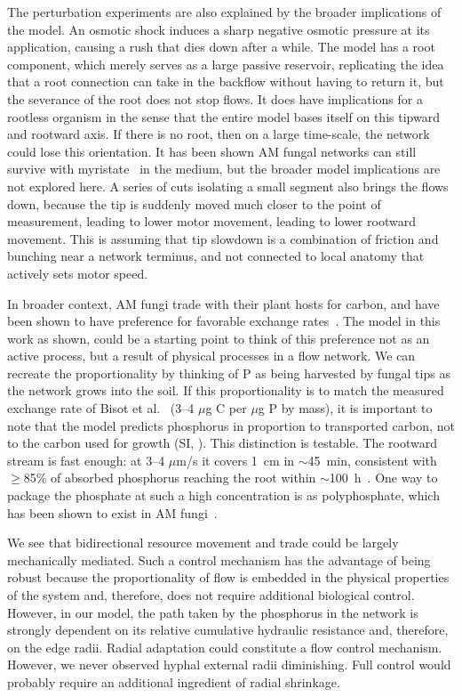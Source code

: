 The perturbation experiments are also explained by the broader implications of the model.
An osmotic shock induces a sharp negative osmotic pressure at its application, causing a rush that dies down after a while.
The model has a root component, which merely serves as a large passive reservoir, replicating the idea that a root connection can take in the backflow without having to return it, but the severance of the root does not stop flows.
It does have implications for a rootless organism in the sense that the entire model bases itself on this tipward and rootward axis.
If there is no root, then on a large time-scale, the network could lose this orientation.
It has been shown AM fungal networks can still survive with myristate~\cite{kleinCytoplasmicFlowDynamics2026} in the medium, but the broader model implications are not explored here.
A series of cuts isolating a small segment also brings the flows down, because the tip is suddenly moved much closer to the point of measurement, leading to lower motor movement, leading to lower rootward movement.
This is assuming that tip slowdown is a combination of friction and bunching near a network terminus, and not connected to local anatomy that actively sets motor speed. 

In broader context, AM fungi trade with their plant hosts for carbon, and have been shown to have preference for favorable exchange rates~\cite{kiers_reciprocal_2011,bisot_carbon-phosphorous_2025}.
The model in this work as shown, could be a starting point to think of this preference not as an active process, but a result of physical processes in a flow network.
We can recreate the proportionality by thinking of P as being harvested by fungal tips as the network grows into the soil.
If this proportionality is to match the measured exchange rate of Bisot et al.~\cite{bisot_carbon-phosphorous_2025} (3--4 $\mu$g C per $\mu$g P by mass), it is important to note that the model predicts phosphorus in proportion to transported carbon, not to the carbon used for growth (SI, ).
This distinction is testable.
The rootward stream is fast enough: at 3--4 $\mu$m/s it covers 1~cm in $\sim$45~min, consistent with $\geq$85\% of absorbed phosphorus reaching the root within $\sim$100~h~\cite{bisot_carbon-phosphorous_2025}.
One way to package the phosphate at such a high concentration is as polyphosphate, which has been shown to exist in AM fungi~\cite{hijikata_polyphosphate_2010,kikuchi_aquaporin-mediated_2016}.

We see that bidirectional resource movement and trade could be largely mechanically mediated.
Such a control mechanism has the advantage of being robust because the proportionality of flow is embedded in the physical properties of the system and, therefore, does not require additional biological control.
However, in our model, the path taken by the phosphorus in the network is strongly dependent on its relative cumulative hydraulic resistance and, therefore, on the edge radii.
Radial adaptation could constitute a flow control mechanism.
However, we never observed hyphal external radii diminishing.
Full control would probably require an additional ingredient of radial shrinkage. 

